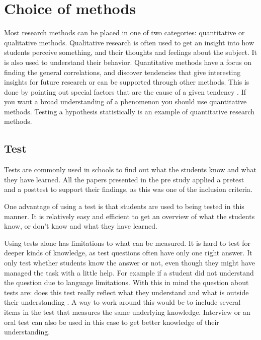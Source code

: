 \chapter{Choice of methods}
Most research methods can be placed in one of two categories: quantitative or qualitative methods. Qualitative research is often used to get an insight into how students perceive something, and their thoughts and feelings about the subject. It is also used to understand their behavior. Quantitative methods have a focus on finding the general correlations, and discover tendencies that give interesting insights for future research or can be supported through other methods. This is done by pointing out special factors that are the cause of a given tendency \cite{tjora2012kvalitative}. If you want a broad understanding of a phenomenon you should use quantitative methods. Testing a hypothesis statistically is an example of quantitative research methods. 

\section{Test}
Tests are commonly used  in schools to find out what the students know and what they have learned. All the papers presented in the pre study applied a pretest and a posttest to support their findings, as this was one of the inclusion criteria. 

\bigskip\noindent
One advantage of using a test is that students are used to being tested in this manner. It is relatively easy and efficient to get an overview of what the students know, or don't know and what they have learned.

\bigskip\noindent
Using tests alone has limitations to what can be measured. It is hard to test for deeper kinds of knowledge, as test questions often have only one right answer. It only test whether students know the answer or not, even though they might have managed the task with a little help. For example if a student did not understand the question due to language limitations. With this in mind the question about tests are: does this test really reflect what they understand and what is outside their understanding \cite{andersen2009evaluering}. A way to work around this would be to include several items in the test that measures the same underlying knowledge. Interview or an oral test can also be used in this case to get better knowledge of their understanding.

